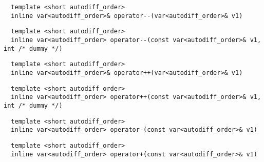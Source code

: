 \begin{tcolorbox}[colback=white,colframe=gray90, coltitle=black,boxrule=3pt,
fonttitle=\bfseries,title=Operator Unary Decrement]

\begin{verbatim}
  template <short autodiff_order>
  inline var<autodiff_order>& operator--(var<autodiff_order>& v1)
\end{verbatim}

\begin{verbatim}
  template <short autodiff_order>
  inline var<autodiff_order> operator--(const var<autodiff_order>& v1, int /* dummy */)
\end{verbatim}

\end{tcolorbox}

\begin{tcolorbox}[colback=white,colframe=gray90, coltitle=black,boxrule=3pt,
fonttitle=\bfseries,title=Operator Unary Increment]

\begin{verbatim}
  template <short autodiff_order>
  inline var<autodiff_order>& operator++(var<autodiff_order>& v1)
\end{verbatim}

\begin{verbatim}
  template <short autodiff_order>
  inline var<autodiff_order> operator++(const var<autodiff_order>& v1, int /* dummy */)
\end{verbatim}

\end{tcolorbox}

\begin{tcolorbox}[colback=white,colframe=gray90, coltitle=black,boxrule=3pt,
fonttitle=\bfseries,title=Operator Unary Minus]

\begin{verbatim}
  template <short autodiff_order>
  inline var<autodiff_order> operator-(const var<autodiff_order>& v1)
\end{verbatim}

\end{tcolorbox}

\begin{tcolorbox}[colback=white,colframe=gray90, coltitle=black,boxrule=3pt,
fonttitle=\bfseries,title=Operator Unary Plus]

\begin{verbatim}
  template <short autodiff_order>
  inline var<autodiff_order> operator+(const var<autodiff_order>& v1)
\end{verbatim}

\end{tcolorbox}

